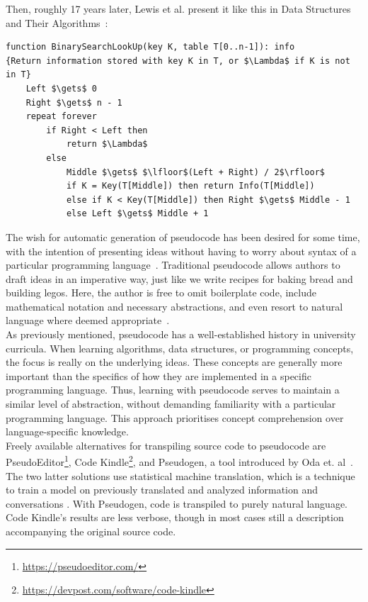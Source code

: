 Then, roughly 17 years later, Lewis et al. present it like this in Data Structures and Their Algorithms~\cite[182]{BOOK:DSA/Lewis}: \hfill \\

\begin{lstlisting}[basicstyle=\footnotesize\ttfamily]
function BinarySearchLookUp(key K, table T[0..n-1]): info
{Return information stored with key K in T, or $\Lambda$ if K is not in T}
    Left $\gets$ 0
    Right $\gets$ n - 1
    repeat forever
        if Right < Left then
            return $\Lambda$
        else
            Middle $\gets$ $\lfloor$(Left + Right) / 2$\rfloor$
            if K = Key(T[Middle]) then return Info(T[Middle])
            else if K < Key(T[Middle]) then Right $\gets$ Middle - 1
            else Left $\gets$ Middle + 1
\end{lstlisting}

The wish for automatic generation of pseudocode has been desired for some time, with the intention of presenting ideas without having to worry about syntax of a particular programming language~\cite{desireToGetPseudocodeGeneration}. Traditional pseudocode allows authors to draft ideas in an imperative way, just like we write recipes for baking bread and building legos. Here, the author is free to omit boilerplate code, include mathematical notation and necessary abstractions, and even resort to natural language where deemed appropriate~\cite{BOOK:intro/Cormen/Leiserson, DBLP:conf/els/Nuallain15}. \hfill \\

As previously mentioned, pseudocode has a well-established history in university curricula. When learning algorithms, data structures, or programming concepts, the focus is really on the underlying ideas. These concepts are generally more important than the specifics of how they are implemented in a specific programming language. Thus, learning with pseudocode serves to maintain a similar level of abstraction, without demanding familiarity with a particular programming language. This approach prioritises concept comprehension over language-specific knowledge. \hfill \\

Freely available alternatives for transpiling source code to pseudocode are PseudoEditor\footnote{\url{https://pseudoeditor.com/}}, Code Kindle\footnote{\url{https://devpost.com/software/code-kindle}}, and Pseudogen, a tool introduced by Oda et. al~\cite{DBLP:conf/kbse/OdaFNHSTN15}. The two latter solutions use statistical machine translation, which is a technique to train a model on previously translated and analyzed information and conversations%
. With Pseudogen, code is transpiled to purely natural language. Code Kindle's results are less verbose, though in most cases still a description accompanying the original source code. \hfill \\

